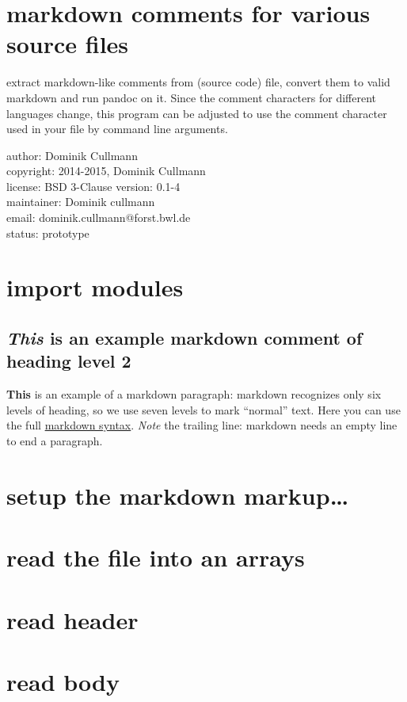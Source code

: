 \documentclass[]{article}
\author{}
\date{}
\begin{document}
\section{markdown comments for various source files}

extract markdown-like comments from (source code) file, convert them to
valid markdown and run pandoc on it. Since the comment characters for
different languages change, this program can be adjusted to use the
comment character used in your file by command line arguments.

author: Dominik Cullmann\\ copyright: 2014-2015, Dominik Cullmann\\
license: BSD 3-Clause version: 0.1-4\\ maintainer: Dominik cullmann\\
email: dominik.cullmann@forst.bwl.de\\ status: prototype

\section{import modules}

\subsection{\emph{This} is an example markdown comment of heading level
2}

\textbf{This} is an example of a markdown paragraph: markdown recognizes
only six levels of heading, so we use seven levels to mark ``normal''
text. Here you can use the full
\href{http://daringfireball.net/projects/markdown/syntax}{markdown
syntax}. \emph{Note} the trailing line: markdown needs an empty line to
end a paragraph.

\section{setup the markdown markup\ldots{}}

\section{read the file into an arrays}

\section{read header}

\section{read body}
\end{document}
